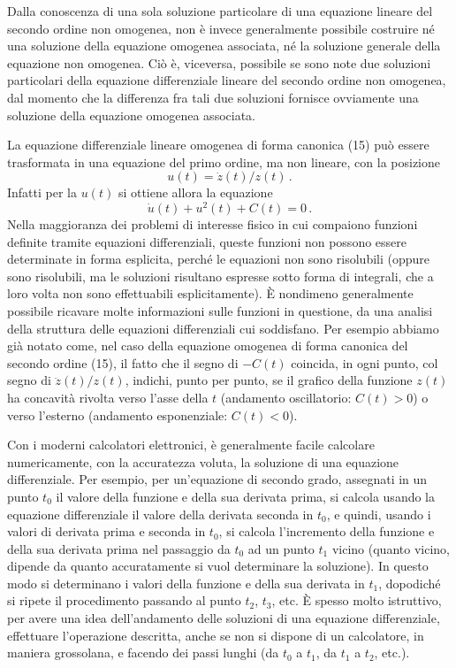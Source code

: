 \documentclass[11pt, a4paper]{book}
\numberwithin{equation}{section}
\begin{document}
Dalla conoscenza di una sola soluzione particolare di una equazione lineare
del secondo ordine non omogenea, non è invece generalmente possibile costruire
né una soluzione della equazione omogenea associata, né la soluzione generale
della equazione non omogenea. Ciò è, viceversa, possibile se sono note due
soluzioni particolari della equazione differenziale lineare del secondo ordine
non omogenea, dal momento che la differenza fra tali due soluzioni fornisce
ovviamente una soluzione della equazione omogenea associata.

La equazione differenziale lineare omogenea di forma canonica (15) può essere
trasformata in una equazione del primo ordine, ma non lineare, con la posizione
\begin{equation}
    u(t) = \dot{z}(t) / z(t) \,. \tag{20}
\end{equation}
Infatti per la $u(t)$ si ottiene allora la equazione
\begin{equation}
    \dot{u}(t) + u^2(t) + C(t) = 0 \,. \tag{21}
\end{equation}
Nella maggioranza dei problemi di interesse fisico in cui compaiono funzioni
definite tramite equazioni differenziali, queste funzioni non possono essere
determinate in forma esplicita, perché le equazioni non sono risolubili (oppure
sono risolubili, ma le soluzioni risultano espresse sotto forma di integrali,
che a loro volta non sono effettuabili esplicitamente). È nondimeno generalmente
possibile ricavare molte informazioni sulle funzioni in questione, da una
analisi della struttura delle equazioni differenziali cui soddisfano. Per
esempio abbiamo già notato come, nel caso della equazione omogenea di forma
canonica del secondo ordine (15), il fatto che il segno di $-C(t)$ coincida, in
ogni punto, col segno di $\ddot{z}(t)/z(t)$, indichi, punto per punto, se il
grafico della funzione $z(t)$ ha concavità rivolta verso l'asse della $t$
(andamento oscillatorio: $C(t)>0$) o verso l'esterno (andamento esponenziale:
$C(t)<0$).

Con i moderni calcolatori elettronici, è generalmente facile calcolare
numericamente, con la accuratezza voluta, la soluzione di una equazione
differenziale. Per esempio, per un'equazione di secondo grado, assegnati in un
punto $t_0$ il valore della funzione e della sua derivata prima, si calcola
usando la equazione differenziale il valore della derivata seconda in $t_0$, e
quindi, usando i valori di derivata prima e seconda in $t_0$, si calcola
l'incremento della funzione e della sua derivata prima nel passaggio da $t_0$ ad
un punto $t_1$ vicino (quanto vicino, dipende da quanto accuratamente si vuol
determinare la soluzione). In questo modo si determinano i valori della
funzione e della sua derivata in $t_1$, dopodiché si ripete il procedimento
passando al punto $t_2$, $t_3$, etc. È spesso molto istruttivo, per avere una
idea dell'andamento delle soluzioni di una equazione differenziale, effettuare
l'operazione descritta, anche se non si dispone di un calcolatore, in maniera
grossolana, e facendo dei passi lunghi (da $t_0$ a $t_1$, da $t_1$ a $t_2$, etc.).
\end{document}
